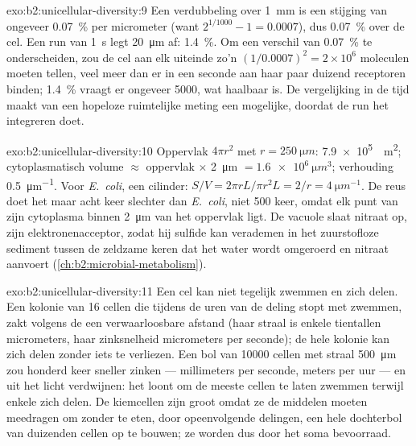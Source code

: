 \begin{solution}{exo:b2:unicellular-diversity:9}
Een verdubbeling over \qty{1}{mm} is een stijging van ongeveer
\qty{0.07}{\%} per micrometer (want $2^{1/1000} - 1 = 0.0007$), dus
\qty{0.07}{\%} over de cel. Een run van \qty{1}{s} legt \qty{20}{\micro m} af:
\qty{1.4}{\%}. Om een verschil van \qty{0.07}{\%} te onderscheiden, zou de
cel aan elk uiteinde zo'n $(1/0.0007)^2 = 2\times 10^6$ moleculen moeten
tellen, veel meer dan er in een seconde aan haar paar duizend receptoren
binden; \qty{1.4}{\%} vraagt er ongeveer \num{5000}, wat haalbaar is. De
vergelijking in de tijd maakt van een hopeloze ruimtelijke meting een
mogelijke, doordat de run het integreren doet.
\end{solution}

\begin{solution}{exo:b2:unicellular-diversity:10}
Oppervlak $4\pi r^2$ met $r = \qty{250}{\micro m}$: \qty{7.9e5}{\micro
m^2}; cytoplasmatisch volume $\approx$ oppervlak $\times$ \qty{2}{\micro m}
$= \qty{1.6e6}{\micro m^3}$; verhouding \qty{0.5}{\micro m^{-1}}. Voor
\emph{E.~coli}, een cilinder: $S/V = 2\pi r L/\pi r^2 L = 2/r =
\qty{4}{\micro m^{-1}}$. De reus doet het maar acht keer slechter dan
\emph{E.~coli}, niet 500 keer, omdat elk punt van zijn cytoplasma
binnen \qty{2}{\micro m} van het oppervlak ligt. De vacuole slaat
nitraat op, zijn elektronenacceptor, zodat hij sulfide kan verademen in
het zuurstofloze sediment tussen de zeldzame keren dat het water wordt
omgeroerd en nitraat aanvoert (\cref{ch:b2:microbial-metabolism}).
\end{solution}

\begin{solution}{exo:b2:unicellular-diversity:11}
Een cel kan niet tegelijk zwemmen en zich delen. Een kolonie van 16
cellen die tijdens de uren van de deling stopt met zwemmen, zakt volgens
de  een verwaarloosbare afstand (haar straal is enkele
tientallen micrometers, haar zinksnelheid micrometers per seconde); de
hele kolonie kan zich delen zonder iets te verliezen. Een bol van
\num{10000} cellen met straal \qty{500}{\micro m} zou honderd keer
sneller zinken --- millimeters per seconde, meters per uur --- en uit
het licht verdwijnen: het loont om de meeste cellen te laten zwemmen
terwijl enkele zich delen. De kiemcellen zijn groot omdat ze de
middelen moeten meedragen om zonder te eten, door opeenvolgende delingen,
een hele dochterbol van duizenden cellen op te bouwen; ze worden dus
door het soma bevoorraad.
\end{solution}

